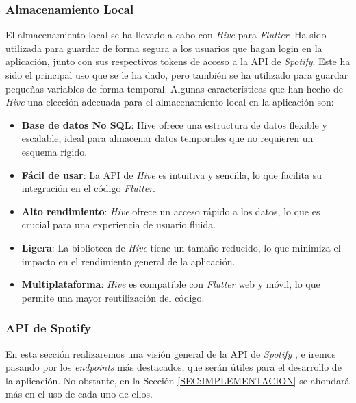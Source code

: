 \subsubsection{Almacenamiento Local\label{subsec:almacenamiento_local}}

El almacenamiento local se ha llevado a cabo con \textit{Hive} \cite{hive} para \textit{Flutter}. Ha sido utilizada
para guardar de forma segura a los usuarios que hagan login en la aplicación, junto con sus respectivos tokens de
 acceso a la API de \textit{Spotify}. Este ha sido el principal uso que se le ha dado, pero también se ha utilizado 
 para guardar pequeñas variables de forma temporal. Algunas características que han hecho de \textit{Hive} una elección
 adecuada para el almacenamiento local en la aplicación son:

\begin{itemize}
  \item \textbf{Base de datos No SQL}: Hive ofrece una estructura de datos flexible y escalable, ideal para almacenar datos temporales que no requieren un esquema rígido.
  \item \textbf{Fácil de usar}: La API de \textit{Hive} es intuitiva y sencilla, lo que facilita su integración en el código \textit{Flutter}.
  \item \textbf{Alto rendimiento}: \textit{Hive} ofrece un acceso rápido a los datos, lo que es crucial para una experiencia de usuario fluida.
  \item \textbf{Ligera}: La biblioteca de \textit{Hive} tiene un tamaño reducido, lo que minimiza el impacto en el rendimiento general de la aplicación.
  \item \textbf{Multiplataforma}: \textit{Hive} es compatible con \textit{Flutter} web y móvil, lo que permite una mayor reutilización del código.
\end{itemize}





\subsubsection{API de Spotify\label{subsec:api_spotify_diseno}}

En esta sección realizaremos una visión general de la API de \textit{Spotify} \cite{spotify_api}, e iremos pasando por
los \textit{endpoints} más destacados, que serán útiles para el desarrollo de la aplicación. No obstante, 
en la Sección \ref{SEC:IMPLEMENTACION} se ahondará más en el uso de cada uno de ellos.

